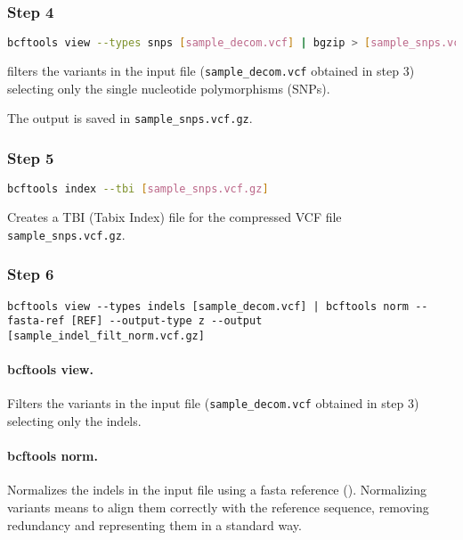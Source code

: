 \subsubsection*{Step 4}
\begin{lstlisting}[breaklines=true, language=bash]
    bcftools view --types snps [sample_decom.vcf] | bgzip > [sample_snps.vcf.gz]
\end{lstlisting}

 filters the variants in the input file (\texttt{sample\_decom.vcf} obtained in step 3) selecting only the single nucleotide polymorphisms (SNPs). 

The output is saved in \texttt{sample\_snps.vcf.gz}.

\subsubsection*{Step 5}
\begin{lstlisting}[breaklines=true, language=bash]
    bcftools index --tbi [sample_snps.vcf.gz]
\end{lstlisting}

Creates a TBI (Tabix Index) file for the compressed VCF file \texttt{sample\_snps.vcf.gz}.

\subsubsection*{Step 6}
\begin{lstlisting}[breaklines=true]
    bcftools view --types indels [sample_decom.vcf] | bcftools norm --fasta-ref [REF] --output-type z --output [sample_indel_filt_norm.vcf.gz]
\end{lstlisting}

\paragraph*{bcftools view.} Filters the variants in the input file (\texttt{sample\_decom.vcf} obtained in step 3) selecting only the indels.

\paragraph*{bcftools norm.} Normalizes the indels in the input file using a fasta reference (). Normalizing variants means to align them correctly with the reference sequence, removing redundancy and representing them in a standard way.

